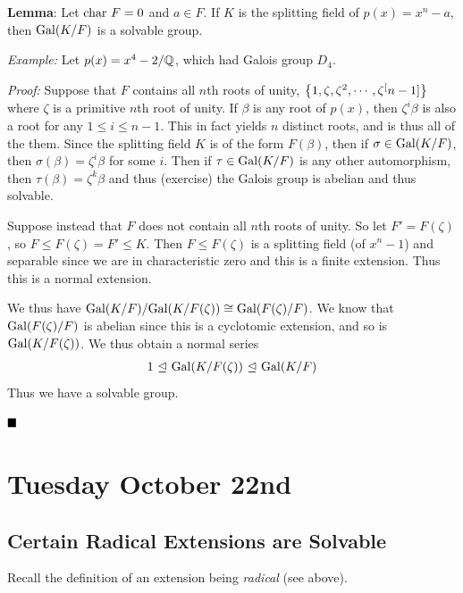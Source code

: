 \textbf{Lemma}: Let \(\mathrm{char}~ F = 0\) and \(a\in F\). If \(K\) is the
splitting field of \(p(x) = x^n-a\), then \(\mathrm{Gal}(K/F)\) is a solvable
group.

\emph{Example:} Let \(p(x) = x^4-2 / {\mathbb{Q}}\), which had Galois group
\(D_4\).

\emph{Proof:} Suppose that \(F\) contains all \(n\)th roots of unity,
\(\left\{{1, \zeta, \zeta^2, \cdots, \zeta^[n-1]}\right\}\) where \(\zeta\) is a
primitive \(n\)th root of unity. If \(\beta\) is any root of \(p(x)\),
then \(\zeta^i\beta\) is also a root for any \(1\leq i \leq n-1\). This
in fact yields \(n\) distinct roots, and is thus all of the them. Since
the splitting field \(K\) is of the form \(F(\beta)\), then if
\(\sigma \in \mathrm{Gal}(K/F)\), then \(\sigma(\beta) = \zeta^i \beta\) for
some \(i\). Then if \(\tau \in \mathrm{Gal}(K/F)\) is any other automorphism,
then \(\tau(\beta) = \zeta^k \beta\) and thus (exercise) the Galois
group is abelian and thus solvable.

Suppose instead that \(F\) does not contain all \(n\)th roots of unity.
So let \(F' = F(\zeta)\), so \(F \leq F(\zeta) = F' \leq K\). Then
\(F \leq F(\zeta)\) is a splitting field (of \(x^n-1\)) and separable
since we are in characteristic zero and this is a finite extension. Thus
this is a normal extension.

We thus have \(\mathrm{Gal}(K/F) / \mathrm{Gal}(K/F(\zeta)) \cong \mathrm{Gal}(F(\zeta)/ F)\).
We know that \(\mathrm{Gal}(F(\zeta)/ F)\) is abelian since this is a cyclotomic
extension, and so is \(\mathrm{Gal}(K/F(\zeta))\). We thus obtain a normal
series
\begin{align*}
1 {~\trianglelefteq~} \mathrm{Gal}(K/F(\zeta)) {~\trianglelefteq~} \mathrm{Gal}(K/F)
\end{align*} Thus we have a solvable group.

\(\qed\)

\hypertarget{tuesday-october-22nd}{%
\section{Tuesday October 22nd}\label{tuesday-october-22nd}}

\hypertarget{certain-radical-extensions-are-solvable}{%
\subsection{Certain Radical Extensions are
Solvable}\label{certain-radical-extensions-are-solvable}}

Recall the definition of an extension being \emph{radical} (see above).

